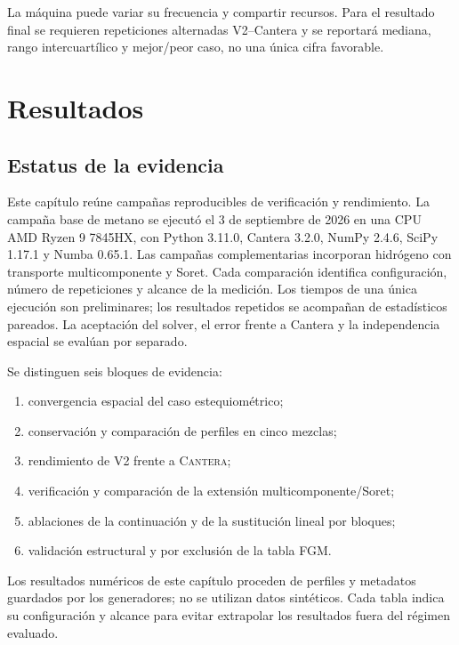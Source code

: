 \documentclass[12pt,a4paper,twoside,openany]{book}
\newcommand{\Vdos}{\textsc{V2}\xspace}
\newcommand{\Cantera}{\textsc{Cantera}\xspace}
\begin{document}
La máquina puede variar su frecuencia y compartir recursos. Para el resultado
final se requieren repeticiones alternadas V2--Cantera y se reportará mediana,
rango intercuartílico y mejor/peor caso, no una única cifra favorable.

\chapter{Resultados}
\label{chap:resultados}

\section{Estatus de la evidencia}

Este capítulo reúne campañas reproducibles de verificación y rendimiento.
La campaña base de metano se ejecutó el 3 de septiembre de 2026 en una CPU AMD
Ryzen 9 7845HX, con Python 3.11.0, Cantera 3.2.0, NumPy 2.4.6, SciPy 1.17.1
y Numba 0.65.1. Las campañas complementarias incorporan hidrógeno con transporte
multicomponente y Soret. Cada comparación identifica configuración, número de
repeticiones y alcance de la medición. Los tiempos de una única ejecución son
preliminares; los resultados repetidos se acompañan de estadísticos pareados.
La aceptación del solver, el error frente a Cantera y la independencia espacial
se evalúan por separado.

Se distinguen seis bloques de evidencia:

\begin{enumerate}
  \item convergencia espacial del caso estequiométrico;
  \item conservación y comparación de perfiles en cinco mezclas;
  \item rendimiento de \Vdos frente a \Cantera;
  \item verificación y comparación de la extensión multicomponente/Soret;
  \item ablaciones de la continuación y de la sustitución lineal por bloques;
  \item validación estructural y por exclusión de la tabla FGM.
\end{enumerate}

Los resultados numéricos de este capítulo proceden de perfiles y metadatos
guardados por los generadores; no se utilizan datos sintéticos. Cada tabla
indica su configuración y alcance para evitar extrapolar los resultados fuera
del régimen evaluado.
\end{document}
